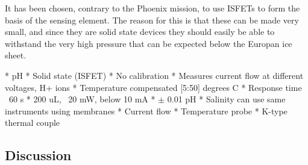 \noindent
It has been chosen, contrary to the Phoenix mission, to use ISFETs to form the basis of the sensing element. The reason for this is that these can be made very small, and since they are solid state devices they should easily be able to withstand the very high pressure that can be expected below the Europan ice sheet.


* pH
	* Solid state (ISFET)
		* No calibration
		* Measures current flow at different voltages, H+ ions
	* Temperature compensated [5:50] degrees C
		* Response time ~60 s
	* 200 uL, ~20 mW, below 10 mA
	* $\pm$ 0.01 pH
* Salinity can use same instruments using membranes
	* Current flow
* Temperature probe
	* K-type thermal couple


\subsection{Discussion}
